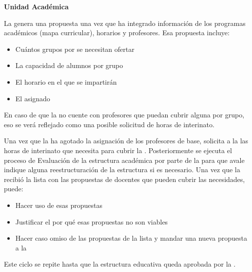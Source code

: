 \begin{PDescripcion}
	
	\Ppaso \textbf{Unidad Académica}
	
	\begin{enumerate}
		
		\Ppaso[\PSubProceso] 
		La  genera una propuesta una vez que ha integrado información de los programas académicos (mapa curricular), horarios y profesores. Esa propuesta incluye:
		\begin{itemize}
			\item Cuántos grupos por  se necesitan ofertar
			\item La capacidad de alumnos por grupo
			\item El horario en el que se impartirán
			\item El  asignado
		\end{itemize}
		
		En caso de que la  no cuente con profesores que puedan cubrir alguna  por grupo, eso se verá reflejado como una posible solicitud de horas de interinato.

		\Ppaso[\PSubProceso] 
		Una vez que la  ha agotado la asignación de los profesores de base, solicita a la  las horas de interinato que necesita para cubrir la . Posteriormente se ejecuta el proceso de Evaluación de la estructura académica por parte de la  para que avale indique alguna reestructuración de la estructura si es necesario.
		\Ppaso[\PSubProceso] 
		Una vez que la  recibió la lista con las propuestas de docentes que pueden cubrir las necesidades, puede:
		\begin{itemize}
			\item Hacer uso de esas propuestas
			\item Justificar el por qué esas propuestas no son viables
			\item Hacer caso omiso de las propuestas de la lista y mandar una nueva propuesta a la 
		\end{itemize}
		Este ciclo se repite hasta que la estructura educativa queda aprobada por la .
		

\end{enumerate}
\end{PDescripcion}
